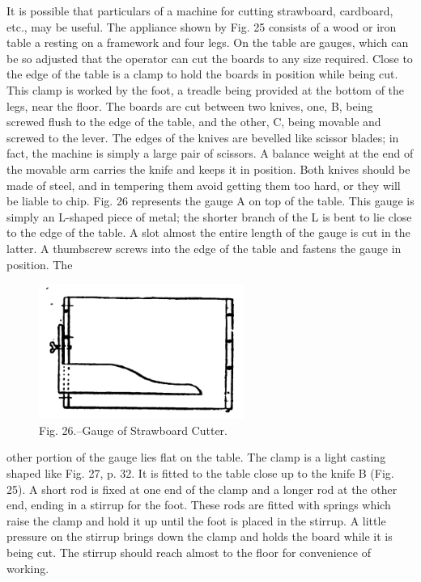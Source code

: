 \documentclass[twoside]{book}
\begin{document}
It is possible that particulars of a machine for
cutting strawboard, cardboard, etc., may be useful.
The appliance shown by Fig. 25 consists of a wood
or iron table a resting on a framework and four legs.
On the table are gauges, which can be so adjusted
that the operator can cut the boards to any size
required. Close to the edge of the table is a clamp
to hold the boards in position while being cut. This
clamp is worked by the foot, a treadle being provided
at the bottom of the legs, near the floor. The
boards are cut between two knives, one, B, being
screwed flush to the edge of the table, and the
other, C, being movable and screwed to the lever.
\pagebreak
The edges of the knives are bevelled like scissor
blades; in fact, the machine is simply a large pair
of scissors. A balance weight at the end of the
movable arm carries the knife and keeps it in position.
Both knives should be made of steel, and in
tempering them avoid getting them too hard, or
they will be liable to chip. Fig. 26 represents the
gauge A on top of the table. This gauge is simply
an L-shaped piece of metal; the shorter branch
of the L is bent to lie close to the edge of the table.
A slot almost the entire length of the gauge is cut in
the latter. A thumbscrew screws into the edge of
the table and fastens the gauge in position. The
	\begin{figure}[h]
		\centering
		\includegraphics[width=0.6\textwidth]{Figures/_026.png}
		\caption*{Fig. 26.--Gauge of Strawboard Cutter.}
	\end{figure}
other portion of the gauge lies flat on the table. The
clamp is a light casting shaped like Fig. 27, p. 32.
It is fitted to the table close up to the knife B
(Fig. 25). A short rod is fixed at one end of the
clamp and a longer rod at the other end, ending in
a stirrup for the foot. These rods are fitted with
springs which raise the clamp and hold it up until
the foot is placed in the stirrup. A little pressure
on the stirrup brings down the clamp and holds
the board while it is being cut. The stirrup should
reach almost to the floor for convenience of working.
\end{document}
